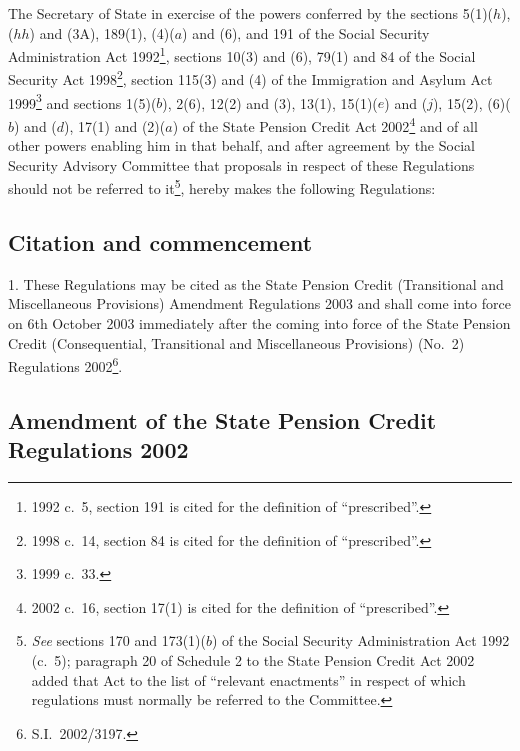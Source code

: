 \documentclass[12pt,a4paper]{article}
\title{\regstitle}
\author{S.I.\ 2003 No.\ 2274}
\date{Made
7th September 2003\\
Laid before Parliament
12th September 2003\\
Coming into force
6th October 2003
}
\begin{document}
\maketitle

\noindent
The Secretary of State in exercise of the powers conferred by the sections 5(1)($h$), ($hh$)  and (3A), 189(1), (4)($a$)  and (6), and 191 of the Social Security Administration Act 1992\footnote{1992 c.\ 5, section 191 is cited for the definition of “prescribed”.}, sections 10(3) and (6), 79(1) and 84 of the Social Security Act 1998\footnote{1998 c.\ 14, section 84 is cited for the definition of “prescribed”.}, section 115(3) and (4) of the Immigration and Asylum Act 1999\footnote{1999 c.\ 33.} and sections 1(5)($b$), 2(6), 12(2) and (3), 13(1), 15(1)($e$)  and ($j$), 15(2), (6)($b$)  and ($d$), 17(1) and (2)($a$)  of the State Pension Credit Act 2002\footnote{2002 c.\ 16, section 17(1) is cited for the definition of “prescribed”.} and of all other powers enabling him in that behalf, and after agreement by the Social Security Advisory Committee that proposals in respect of these Regulations should not be referred to it\footnote{\emph{See} sections 170 and 173(1)($b$)  of the Social Security Administration Act 1992 (c.\ 5); paragraph 20 of Schedule 2 to the State Pension Credit Act 2002 added that Act to the list of “relevant enactments” in respect of which regulations must normally be referred to the Committee.}, hereby makes the following Regulations: 

{\sloppy

\tableofcontents

}

\bigskip

\setcounter{secnumdepth}{-2}

\subsection[1. Citation and commencement]{Citation and commencement}

1.  These Regulations may be cited as the State Pension Credit (Transitional and Miscellaneous Provisions) Amendment Regulations 2003 and shall come into force on 6th October 2003 immediately after the coming into force of the State Pension Credit (Consequential, Transitional and Miscellaneous Provisions) (No.\ 2) Regulations 2002\footnote{S.I.\ 2002/3197.}.

\subsection[2. Amendment of the State Pension Credit Regulations 2002]{Amendment of the State Pension Credit Regulations 2002}
\end{document}
